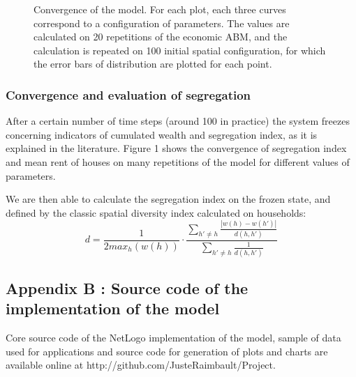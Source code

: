 \documentclass[a4paper,twocolumn,twoside,10pt]{article}
\begin{document}
\begin{figure}[htp]
\centering

\hfill{}

\caption{Convergence of the model. For each plot, each three curves correspond
to a configuration of parameters. The values are calculated on 20
repetitions of the economic ABM, and the calculation is repeated on
100 initial spatial configuration, for which the error bars of distribution
are plotted for each point.}

\label{fig8}

\end{figure}



\subsubsection*{Convergence and evaluation of segregation}

After a certain number of time steps (around 100 in practice) the
system freezes concerning indicators of cumulated wealth and segregation
index, as it is explained in the literature. Figure 1 shows the convergence
of segregation index and mean rent of houses on many repetitions of
the model for different values of parameters.

We are then able to calculate the segregation index on the frozen
state, and defined by the classic spatial diversity index calculated
on households:
\[
d=\frac{1}{2max_{h}(w(h))}\cdot\frac{\sum_{h'\neq h}\frac{\left|w(h)-w(h')\right|}{d(h,h')}}{\sum_{h'\neq h}\frac{1}{d(h,h')}}
\]


\bigskip{}
\bigskip{}

\subsection*{Appendix B : Source code of the implementation of the model}

Core source code of the NetLogo implementation of the model, sample
of data used for applications and source code for generation of plots
and charts are available online at
http://github.com/JusteRaimbault/Project.
\end{document}
